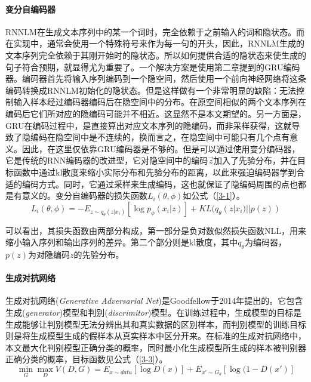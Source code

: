 \paragraph{变分自编码器}
RNNLM在生成文本序列中的某一个词时，完全依赖于之前输入的词和隐状态。而在实现中，通常会使用一个特殊符号来作为每一句的开头，因此，RNNLM生成的文本序列完全依赖于其刚开始时的隐状态。所以如何提供合适的隐状态来使生成的句子符合预期，就显得尤为重要了。一个解决方案是使用第二章提到的GRU编码器。编码器首先将输入序列编码到一个隐空间，然后使用一个前向神经网络将这条编码转换成RNNLM初始化的隐状态。但是这样做有一个非常明显的缺陷：无法控制输入样本经过编码器编码后在隐空间中的分布。在原空间相似的两个文本序列在编码后它们所对应的隐编码可能并不相近。这显然不是本文期望的。另一方面是，GRU在编码过程中，是直接算出对应文本序列的隐编码，而非采样获得，这就导致了隐编码在隐空间中是不连续的，换而言之，在隐空间中可能只有几个点有意义。因此，在这里仅依靠GRU编码器是不够的。但是可以通过使用变分编码器，它是传统的RNN编码器的改进型，它对隐空间中的编码\(\overrightarrow{z}\)加入了先验分布，并在目标函数中通过kl散度来缩小实际分布和先验分布的距离，以此来强迫编码器学到合适的编码方式。同时，它通过采样来生成编码，这也就保证了隐编码周围的点也都是有意义的。变分自编码器的损失函数$L_i(\theta,\phi)$如公式（\ref{3-1}）。
\begin{equation}\label{3-1}
    L_i(\theta,\phi)=-E_{z\sim q_\theta(z|x_i)}[\log p_\phi(x_i|z)]+KL (q_\theta(z|x_i)||p(z))
\end{equation}

可以看出，其损失函数由两部分构成，第一部分是负对数似然损失函数NLL，用来缩小输入序列和输出序列的差异。第二个部分则是kl散度，其中$q_\theta$为编码器，$p(z)$为对隐编码$z$的先验分布。
\paragraph{生成对抗网络}
生成对抗网络(\textit{Generative Adversarial Net}\cite{goodfellow_generative_2014})是Goodfellow于2014年提出的。它包含生成(\textit{generator})模型和判别(\textit{discrimitor})模型。在训练过程中，生成模型的目标是生成能够让判别模型无法分辨出其和真实数据的区别样本，而判别模型的训练目标则是将生成模型生成的假样本从真实样本中区分开来。在标准的生成对抗网络中，本文最大化判别模型正确分类的概率，同时最小化生成模型所生成的样本被判别器正确分类的概率，目标函数见公式（\ref{3-3}）。
\begin{equation}\label{3-3}
    \mathop{min}_G \mathop{max}_D V(D,G)=E_{x\sim data}[\log D(x)]+E_{x'\sim G_\theta}[\log(1-D(x')]
\end{equation}


